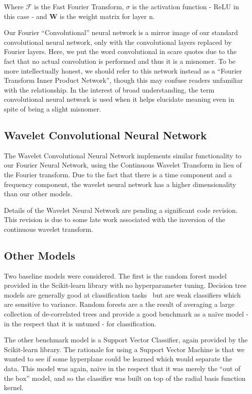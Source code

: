 \documentclass[10pt]{article}
\begin{document}
Where $\mathcal{F}$ is the Fast Fourier Transform, $\sigma$ is the activation function - ReLU in this case - and $\mathbf{W}$ is the weight matrix for layer n.

Our Fourier ``Convolutional'' neural network is a mirror image of our standard convolutional neural network, only with the convolutional layers replaced by Fourier layers.
Here, we put the word convolutional in scare quotes due to the fact that no actual convolution is performed and thus it is a misnomer.
To be more intellectually honest, we should refer to this network instead as a ``Fourier Transform Inner Product Network'', though this may confuse readers unfamiliar with the relationship.
In the interest of broad understanding, the term convolutional neural network is used when it helps elucidate meaning even in spite of being a slight misnomer.

\subsection{Wavelet Convolutional Neural Network} \label{wavelet cnn}
The Wavelet Convolutional Neural Network implements similar functionality to our Fourier Neural Network, using the Continuous Wavelet Transform in lieu of the Fourier transform.
Due to the fact that there is a time component and a frequency component, the wavelet neural network has a higher dimensionality than our other models. 

Details of the Wavelet Neural Network are pending a significant code revision.
This revision is due to some late work associated with the inversion of the continuous wavelet transform.

\subsection{Other Models} \label{other models}
Two baseline models were considered.
The first is the random forest model provided in the Scikit-learn library with no hyperparameter tuning.
Decision tree models are generally good at classification tasks~\cite{hastie01statisticallearning} but are weak classifiers which are sensitive to variance.
Random forests are a the result of averaging a large collection of de-correlated trees and provide a good benchmark as a na\"ive model - in the respect that it is untuned - for classification.

The other benchmark model is a Support Vector Classifier, again provided by the Scikit-learn library.
The rationale for using a Support Vector Machine is that we wanted to see if some hyperplane could be learned which would separate the data.
This model was again, na\"ive in the respect that it was merely the ``out of the box'' model, and so the classifier was built on top of the radial basis function kernel.
\end{document}

